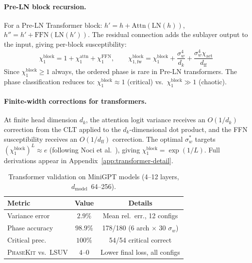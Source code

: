 \documentclass[10pt]{article}
\newcommand{\ToolName}{\textsc{PhaseKit}}
\begin{document}
\paragraph{Pre-LN block recursion.}
For a Pre-LN Transformer block: $h' = h + \text{Attn}(\text{LN}(h))$, $h'' = h' + \text{FFN}(\text{LN}(h'))$.
The residual connection adds the sublayer output to the input, giving per-block susceptibility:
\begin{equation}
    \chi_1^{\text{block}} = 1 + \chi_1^{\text{attn}} + \chi_1^{\text{FFN}}, \qquad
    \chi_{1,\text{fw}}^{\text{block}} = \chi_1^{\text{block}} + \frac{\sigma_w^4}{d_k} + \frac{\sigma_w^4 \chi_{\text{act}}}{d_{\text{ff}}}
    \label{eq:block-chi1}
\end{equation}
Since $\chi_1^{\text{block}} \geq 1$ always, the ordered phase is rare in Pre-LN transformers.
The phase classification reduces to: $\chi_1^{\text{block}} \approx 1$ (critical) vs.\ $\chi_1^{\text{block}} \gg 1$ (chaotic).

\paragraph{Finite-width corrections for transformers.}
At finite head dimension $d_k$, the attention logit variance receives an $O(1/d_k)$ correction from the CLT applied to the $d_k$-dimensional dot product, and the FFN susceptibility receives an $O(1/d_{\text{ff}})$ correction.
The optimal $\sigma_w^*$ targets $(\chi_1^{\text{block}})^L \approx e$ (following Noci et al.~\cite{noci2022signal}), giving $\chi_1^{\text{block}} = \exp(1/L)$.
Full derivations appear in Appendix~\ref{app:transformer-detail}.

\begin{table}[t]
\centering
\caption{Transformer validation on MiniGPT models (4--12 layers, $d_{\text{model}}$~64--256).}
\label{tab:transformer-results}
\small
\begin{tabular}{@{}lcc@{}}
\toprule
\textbf{Metric} & \textbf{Value} & \textbf{Details} \\
\midrule
Variance error & $2.9\%$ & Mean rel.\ err., 12 configs \\
Phase accuracy & $98.9\%$ & 178/180 (6 arch $\times$ 30 $\sigma_w$) \\
Critical prec. & $100\%$ & 54/54 critical correct \\
\ToolName{} vs.\ LSUV & $4$--$0$ & Lower final loss, all configs \\
\bottomrule
\end{tabular}
\end{table}
\end{document}
